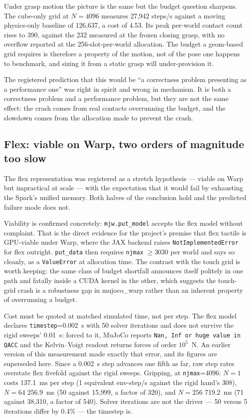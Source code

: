 \documentclass[journal]{IEEEtran}
\begin{document}
Under grasp motion the picture is the same but the budget question sharpens. The cube-only grid at $N=4096$ measures 27,942 steps/s against a moving physics-only baseline of 126,637, a cost of 4.53. Its peak per-world contact count rises to 390, against the 232 measured at the frozen closing grasp, with no overflow reported at the 256-slot-per-world allocation. The budget a geom-based grid requires is therefore a property of the motion, not of the pose one happens to benchmark, and sizing it from a static grasp will under-provision it.

The registered prediction that this would be ``a correctness problem presenting as a performance one'' was right in spirit and wrong in mechanism. It is both a correctness problem and a performance problem, but they are not the same effect: the crash comes from real contacts overrunning the budget, and the slowdown comes from the allocation made to prevent the crash.

\subsection{Flex: viable on Warp, two orders of magnitude too slow}
\label{sec:flex}

The flex representation was registered as a stretch hypothesis --- viable on Warp but impractical at scale --- with the expectation that it would fail by exhausting the Spark's unified memory. Both halves of the conclusion hold and the predicted failure mode does not.

Viability is confirmed concretely: \texttt{mjw.put\_model} accepts the flex model without complaint. That is the direct evidence for the project's premise that flex tactile is GPU-viable under Warp, where the JAX backend raises \texttt{NotImplementedError} for flex outright. \texttt{put\_data} then requires \texttt{njmax} $\geq 3030$ per world and says so cleanly, as a \texttt{ValueError} at allocation time. The contrast with the touch grid is worth keeping: the same class of budget shortfall announces itself politely in one path and fatally inside a CUDA kernel in the other, which suggests the touch-grid crash is a robustness gap in mujoco\_warp rather than an inherent property of overrunning a budget.

Cost must be quoted at matched simulated time, not per step. The flex model declares \texttt{timestep}=0.002~s with 50 solver iterations and does not survive the rigid sweeps' 0.01~s: forced to it, MuJoCo reports \texttt{Nan, Inf or huge value in QACC} and the Kelvin--Voigt readout returns forces of order $10^5$~N. An earlier version of this measurement made exactly that error, and its figures are superseded here. Since a 0.002~s step advances one fifth as far, raw step rates overstate flex fivefold against the rigid sweeps. Gripping, at \texttt{njmax}=4096: $N=1$ costs 137.1~ms per step (1 equivalent env-step/s against the rigid hand's 308), $N=64$ 256.9~ms (50 against 15{,}999, a factor of 320), and $N=256$ 719.2~ms (71 against 38{,}310, a factor of 540). Solver iterations are not the driver --- 50 versus 5 iterations differ by 0.4\% --- the timestep is.
\end{document}
